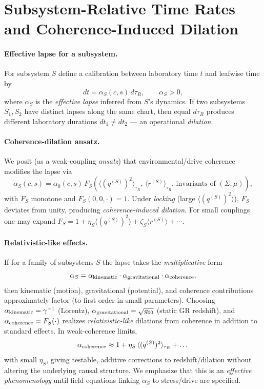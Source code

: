 \documentclass[11pt]{article}
\begin{document}
\section{Subsystem-Relative Time Rates and Coherence-Induced Dilation}\label{sec:dilation}

\paragraph{Effective lapse for a subsystem.} For subsystem $S$ define a calibration between laboratory time $t$ and leafwise time by
\begin{equation}
dt = \alpha_S(c,s)\, d\tau_R,\qquad \alpha_S>0,
\end{equation}
where $\alpha_S$ is the \emph{effective lapse} inferred from $S$'s dynamics. If two subsystems $S_1,S_2$ have distinct lapses along the same chart, then equal $d\tau_R$ produces different laboratory durations $dt_1\neq dt_2$ --- an operational \emph{dilation}.

\paragraph{Coherence-dilation ansatz.} We posit (as a weak-coupling \emph{ansatz}) that environmental/drive coherence modifies the lapse via
\begin{equation}\label{eq:lapse}
\alpha_S(c,s)=\alpha_0(c,s)\,F_S\!\left(\langle (q^{(S)})^2\rangle_{\tau_R},\,\langle r^{(S)}\rangle_{\tau_R},\,\text{invariants of }(\Sigma,\mu)\right),
\end{equation}
with $F_S$ monotone and $F_S(0,0,\cdot)=1$. Under \emph{locking} (large $\langle (q^{(S)})^2\rangle$), $F_S$ deviates from unity, producing \emph{coherence-induced dilation}. For small couplings one may expand $F_S=1+\eta_S\langle (q^{(S)})^2\rangle+\zeta_S\langle r^{(S)}\rangle+\cdots$.

\paragraph{Relativistic-like effects.} If for a family of subsystems $S$ the lapse takes the \emph{multiplicative} form
\begin{equation}
\alpha_S=\alpha_{\rm kinematic}\cdot \alpha_{\rm gravitational}\cdot \alpha_{\rm coherence},
\end{equation}
then kinematic (motion), gravitational (potential), and coherence contributions approximately factor (to first order in small parameters). Choosing
$\alpha_{\rm kinematic}=\gamma^{-1}$ (Lorentz), $\alpha_{\rm gravitational}=\sqrt{g_{00}}$ (static GR redshift), and
$\alpha_{\rm coherence}=F_S(\cdot)$ realizes \emph{relativistic-like} dilations from coherence in addition to standard effects. In weak-coherence limits,
\begin{equation}
\alpha_{\rm coherence}\approx 1+\eta_S\,\langle (q^{(S)})^2\rangle_{\tau_R}+\dots
\end{equation}
with small $\eta_S$, giving testable, additive corrections to redshift/dilation without altering the underlying causal structure.
We emphasize that this is an \emph{effective phenomenology} until field equations linking $\alpha_S$ to stress/drive are specified.
\end{document}
